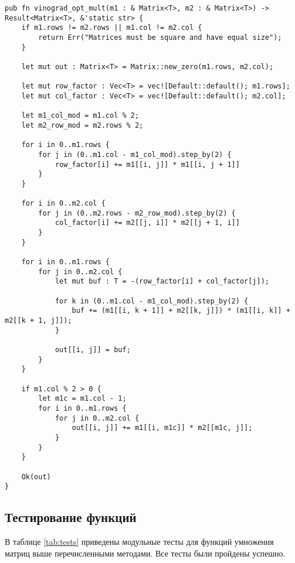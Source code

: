 \begin{lstlisting}[caption=Оптимизированный алгоритм умножения матриц Винограда, label=list:vinograd, language={}]
pub fn vinograd_opt_mult(m1 : & Matrix<T>, m2 : & Matrix<T>) -> Result<Matrix<T>, &'static str> {
    if m1.rows != m2.rows || m1.col != m2.col {
        return Err("Matrices must be square and have equal size");
    }

    let mut out : Matrix<T> = Matrix::new_zero(m1.rows, m2.col);

    let mut row_factor : Vec<T> = vec![Default::default(); m1.rows];
    let mut col_factor : Vec<T> = vec![Default::default(); m2.col];

    let m1_col_mod = m1.col % 2;
    let m2_row_mod = m2.rows % 2;

    for i in 0..m1.rows {
        for j in (0..m1.col - m1_col_mod).step_by(2) {
            row_factor[i] += m1[[i, j]] * m1[[i, j + 1]]
        }
    }

    for i in 0..m2.col {
        for j in (0..m2.rows - m2_row_mod).step_by(2) {
            col_factor[i] += m2[[j, i]] * m2[[j + 1, i]]
        }
    }

    for i in 0..m1.rows {
        for j in 0..m2.col {
            let mut buf : T = -(row_factor[i] + col_factor[j]);

            for k in (0..m1.col - m1_col_mod).step_by(2) {
                buf += (m1[[i, k + 1]] + m2[[k, j]]) * (m1[[i, k]] + m2[[k + 1, j]]);
            }

            out[[i, j]] = buf;
        }
    }

    if m1.col % 2 > 0 {
        let m1c = m1.col - 1;
        for i in 0..m1.rows {
            for j in 0..m2.col {
                out[[i, j]] += m1[[i, m1c]] * m2[[m1c, j]];
            }
        }
    }

    Ok(out)
}
\end{lstlisting}

\subsection{Тестирование функций}

В таблице \ref{tab:tests} приведены модульные тесты для функций умножения матриц выше перечисленными методами. Все тесты были пройдены успешно. \\

